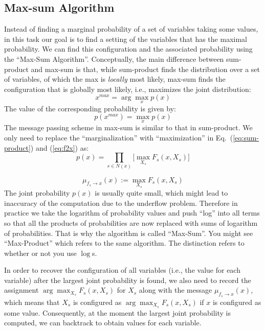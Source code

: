 \documentclass[11pt]{article}
\begin{document}
\subsection{Max-sum Algorithm} %
Instead of finding a marginal probability of a set of variables taking some values, in this task our goal is to find a setting of the variables that has the maximal probability. We can find this configuration and the associated probability using the ``Max-Sum Algorithm''. Conceptually, the main difference between sum-product and max-sum is that, while sum-product finds the distribution over a set of variables, of which the max is \textit{locally} most likely, max-sum finds the configuration that is globally most likely, i.e., maximizes the joint distribution:
\begin{equation}
    x^{max} = \arg\max\limits_x p(x)
\end{equation}
The value of the corresponding probability is given by:
\begin{equation}
    p(x^{max}) = \max\limits_x p(x)
\end{equation}
The message passing scheme in max-sum is similar to that in sum-product. We only need to replace the ``marginalization'' with ``maximization'' in Eq.~(\ref{eq:sum-product}) and (\ref{eq:f2x}) as:
\begin{equation}
	p(x) = \prod_{s \in N(x)} \Bigg[ \max_{X_s} F_s(x, X_s) \Bigg]
\end{equation}

\begin{equation}
    \mu_{f_s \rightarrow x}(x) := \max_{X_s} F_s(x, X_s)
\end{equation}
The joint probability $p(x)$ is usually quite small, which might lead to inaccuracy of the computation due to the underflow problem. Therefore in practice we take the logarithm of probability values and push ``log'' into all terms so that all the products of probabilities are now replaced with sums of logarithm of probabilities. That is why the algorithm is called ``Max-Sum''. You might see ``Max-Product'' which refers to the same algorithm. The distinction refers
to whether or not you use $\log$s.

In order to recover the configuration of all variables (i.e., the value for each variable) after the largest joint probability is found, we also need to record the assignment $\arg\max_{X_s} F_s(x, X_s)$ for $X_s$ along with the message $\mu_{f_s \rightarrow x}(x)$, which means that $X_s$ is configured as $\arg\max_{X_s} F_s(x, X_s)$ if $x$ is configured as some value. Consequently, at the moment the largest joint probability is computed, we can backtrack to obtain values for each variable.
\end{document}
